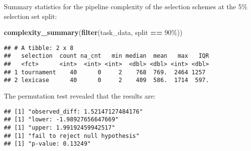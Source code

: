 \documentclass[
]{book}
\newenvironment{Shaded}{\begin{snugshade}}{\end{snugshade}}
\newcommand{\AttributeTok}[1]{\textcolor[rgb]{0.13,0.29,0.53}{#1}}
\newcommand{\DecValTok}[1]{\textcolor[rgb]{0.00,0.00,0.81}{#1}}
\newcommand{\FunctionTok}[1]{\textcolor[rgb]{0.13,0.29,0.53}{\textbf{#1}}}
\newcommand{\NormalTok}[1]{#1}
\newcommand{\OtherTok}[1]{\textcolor[rgb]{0.56,0.35,0.01}{#1}}
\newcommand{\SpecialCharTok}[1]{\textcolor[rgb]{0.81,0.36,0.00}{\textbf{#1}}}
\newcommand{\StringTok}[1]{\textcolor[rgb]{0.31,0.60,0.02}{#1}}
\begin{document}
Summary statistics for the pipeline complexity of the selection schemes at the 5\% selection set split:

\begin{Shaded}
\begin{Highlighting}[]
\FunctionTok{complexity\_summary}\NormalTok{(}\FunctionTok{filter}\NormalTok{(task\_data, split }\SpecialCharTok{==} \StringTok{\textquotesingle{}90\%\textquotesingle{}}\NormalTok{))}
\end{Highlighting}
\end{Shaded}

\begin{verbatim}
## # A tibble: 2 x 8
##   selection  count na_cnt   min median  mean   max   IQR
##   <fct>      <int>  <int> <int>  <dbl> <dbl> <int> <dbl>
## 1 tournament    40      0     2    768  769.  2464 1257 
## 2 lexicase      40      0     2    409  586.  1714  597.
\end{verbatim}

The permutation test revealed that the results are:

\begin{Shaded}
\end{Shaded}

\begin{verbatim}
## [1] "observed_diff: 1.52147127484176"
## [1] "lower: -1.98927656647669"
## [1] "upper: 1.99192459942517"
## [1] "fail to reject null hypothesis"
## [1] "p-value: 0.13249"
\end{verbatim}
\end{document}

